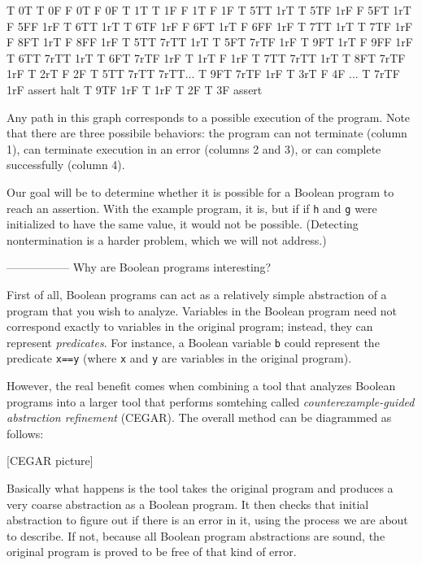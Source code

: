 \documentclass{article}
\newcommand{\Code}[1]{\texttt{#1}}
\begin{document}
  T 0T               T 0F            F 0T          F 0F
  T 1T               T 1F            F 1T          F 1F
  T 5TT 1rT          T 5TF 1rF       F 5FT 1rT     F 5FF 1rF
  T 6TT 1rT          T 6TF 1rF       F 6FT 1rT     F 6FF 1rF
  T 7TT 1rT          T 7TF 1rF       F 8FT 1rT     F 8FF 1rF
  T 5TT 7rTT 1rT     T 5FT 7rTF 1rF  T 9FT 1rT     F 9FF 1rF
  T 6TT 7rTT 1rT     T 6FT 7rTF 1rF  T 1rT         F 1rF
  T 7TT 7rTT 1rT     T 8FT 7rTF 1rF  T 2rT         F 2F
  T 5TT 7rTT 7rTT... T 9FT 7rTF 1rF  T 3rT         F 4F
       ...           T 7rTF 1rF      assert        halt
                     T 9TF 1rF
                     T 1rF
                     T 2F
                     T 3F
                     assert


Any path in this graph corresponds to a possible execution of the
program. Note that there are three possibile behaviors: the program
can not terminate (column 1), can terminate execution in an error
(columns 2 and 3), or can complete successfully (column 4).

Our goal will be to determine whether it is possible for a Boolean
program to reach an assertion. With the example program, it is, but if
if \Code{h} and \Code{g} were initialized to have the same value, it
would not be possible. (Detecting nontermination is a harder problem,
which we will not address.)

-----------------
Why are Boolean programs interesting?

First of all, Boolean programs can act as a relatively simple
abstraction of a program that you wish to analyze. Variables in the
Boolean program need not correspond exactly to variables in the
original program; instead, they can represent \emph{predicates}. For
instance, a Boolean variable \Code{b} could represent the predicate
\Code{x==y} (where \Code{x} and \Code{y} are variables in the original
program).

However, the real benefit comes when combining a tool that analyzes
Boolean programs into a larger tool that performs somtehing called
\emph{counterexample-guided abstraction refinement} (CEGAR). The
overall method can be diagrammed as follows:

[CEGAR picture]

Basically what happens is the tool takes the original program and
produces a very coarse abstraction as a Boolean program. It then
checks that initial abstraction to figure out if there is an error in
it, using the process we are about to describe. If not, because all
Boolean program abstractions are sound, the original program is proved
to be free of that kind of error.
\end{document}

